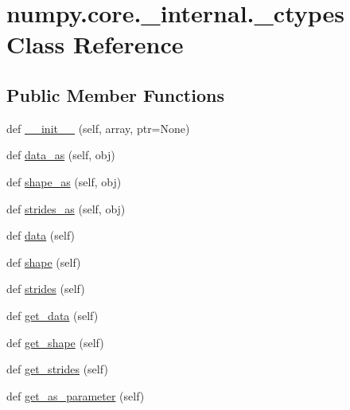 \hypertarget{classnumpy_1_1core_1_1__internal_1_1__ctypes}{}\section{numpy.\+core.\+\_\+internal.\+\_\+ctypes Class Reference}
\label{classnumpy_1_1core_1_1__internal_1_1__ctypes}
\subsection*{Public Member Functions}
\begin{DoxyCompactItemize}
\item 
def \hyperlink{classnumpy_1_1core_1_1__internal_1_1__ctypes_a8db418685bd9235a5882d7ff15fb04b6}{\+\_\+\+\_\+init\+\_\+\+\_\+} (self, array, ptr=None)
\item 
def \hyperlink{classnumpy_1_1core_1_1__internal_1_1__ctypes_a0fe1e07d0e15c91c5eb499dbfb1faf3e}{data\+\_\+as} (self, obj)
\item 
def \hyperlink{classnumpy_1_1core_1_1__internal_1_1__ctypes_a470eb2d89822b0394bd7b3ab8b77ad67}{shape\+\_\+as} (self, obj)
\item 
def \hyperlink{classnumpy_1_1core_1_1__internal_1_1__ctypes_a556e6c2bc96210705c6462bfe9f7258b}{strides\+\_\+as} (self, obj)
\item 
def \hyperlink{classnumpy_1_1core_1_1__internal_1_1__ctypes_aa1de35e81ef909a4d1fd1f183ab7299c}{data} (self)
\item 
def \hyperlink{classnumpy_1_1core_1_1__internal_1_1__ctypes_ad540640e42cdc1a70b1408f75963915d}{shape} (self)
\item 
def \hyperlink{classnumpy_1_1core_1_1__internal_1_1__ctypes_a24943eab345390d3f2ccdb19519108b1}{strides} (self)
\item 
def \hyperlink{classnumpy_1_1core_1_1__internal_1_1__ctypes_a4ab2b9a4d61454fc5f2fa86c6abe7d57}{get\+\_\+data} (self)
\item 
def \hyperlink{classnumpy_1_1core_1_1__internal_1_1__ctypes_a76e754263c16d6c016b2cdd1249b7d47}{get\+\_\+shape} (self)
\item 
def \hyperlink{classnumpy_1_1core_1_1__internal_1_1__ctypes_a285cdb09899dcc69ca6a863a399e6417}{get\+\_\+strides} (self)
\item 
def \hyperlink{classnumpy_1_1core_1_1__internal_1_1__ctypes_a6be9acd30b8fe40f0837207dc86b9334}{get\+\_\+as\+\_\+parameter} (self)
\end{DoxyCompactItemize}


